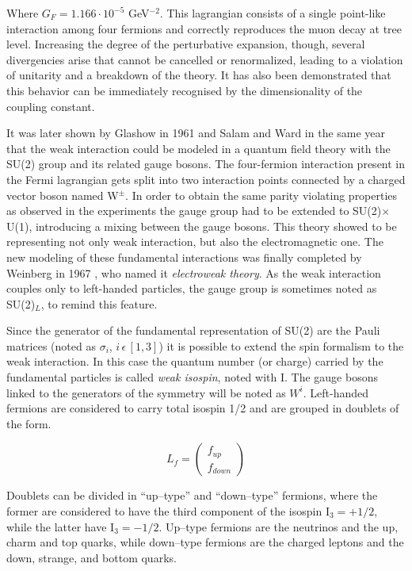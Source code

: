 Where $G_F = 1.166 \cdot 10^{-5}$ GeV$^{-2}$. This lagrangian consists of a single point-like interaction among four fermions and correctly reproduces the muon decay at tree level. Increasing the degree of the perturbative expansion, though, several divergencies arise that cannot be cancelled or renormalized, leading to a violation of unitarity and a breakdown of the theory. It has also been demonstrated that this behavior can be immediately recognised by the dimensionality of the coupling constant.

It was later shown by Glashow in 1961 \cite{Glashow:1961tr} and Salam and Ward \cite{Salam:1961en} in the same year that the weak interaction could be modeled in a quantum field theory with the SU(2) group and its related gauge bosons. 
The four-fermion interaction present in the Fermi lagrangian gets split into two interaction points connected by a charged vector boson named W$^\pm$. In order to obtain the same parity violating properties as observed in the experiments the gauge group had to be extended to SU(2)$\times$U(1), introducing a mixing between the gauge bosons. This theory showed to be representing not only weak interaction, but also the electromagnetic one. 
The new modeling of these fundamental interactions was finally completed by Weinberg in 1967 \cite{Weinberg:1967tq}, who named it \emph{electroweak theory}. 
As the weak interaction couples only to left-handed particles, the gauge group is sometimes noted as SU(2)$_L$, to remind this feature.

Since the generator of the fundamental representation of SU(2) are the Pauli matrices (noted as $\sigma_i$, $i \, \epsilon \, [1,3]$) it is possible to extend the spin formalism to the weak interaction. In this case the quantum number (or charge) carried by the fundamental particles is called \emph{weak isospin}, noted with I. The gauge bosons linked to the generators of the symmetry will be noted as $W^i$. Left-handed fermions are considered to carry total isospin 1/2 and are grouped in doublets of the form.

\begin{equation}
L_f = \left(\begin{array}{c}f_{up} \\f_{down}\end{array}\right)
\end{equation}

Doublets can be divided in ``up--type'' and ``down--type'' fermions, where the former are considered to have the third component of the isospin I$_3 = +1/2$, while the latter have I$_3 = -1/2$. Up--type fermions are the neutrinos and the up, charm and top quarks, while down--type fermions are the charged leptons and the down, strange, and bottom quarks.

